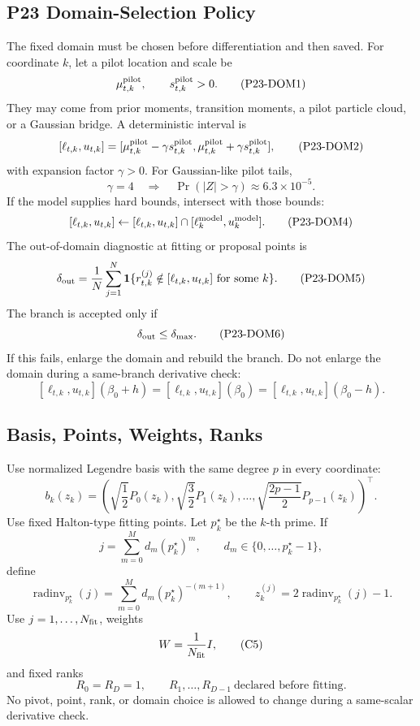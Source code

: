 \documentclass[11pt]{article}
\newcommand{\ind}{\mathbf 1}
\begin{document}
\subsection*{P23 Domain-Selection Policy}

The fixed domain must be chosen before differentiation and then saved.  For
coordinate \(k\), let a pilot location and scale be
\[
    \mu_{t,k}^{\rm pilot},
    \qquad
    s_{t,k}^{\rm pilot}>0.
    \tag{P23-DOM1}
\]
They may come from prior moments, transition moments, a pilot particle cloud,
or a Gaussian bridge.  A deterministic interval is
\[
    [\ell_{t,k},u_{t,k}]
    =
    [\mu_{t,k}^{\rm pilot}-\gamma s_{t,k}^{\rm pilot},
     \mu_{t,k}^{\rm pilot}+\gamma s_{t,k}^{\rm pilot}],
    \tag{P23-DOM2}
\]
with expansion factor \(\gamma>0\).  For Gaussian-like pilot tails,
\[
    \gamma=4
    \quad\Rightarrow\quad
    \Pr(|Z|>\gamma)\approx 6.3\times 10^{-5}.
    \tag{P23-DOM3}
\]
If the model supplies hard bounds, intersect with those bounds:
\[
    [\ell_{t,k},u_{t,k}]
    \leftarrow
    [\ell_{t,k},u_{t,k}]
    \cap
    [\ell_{k}^{\rm model},u_{k}^{\rm model}].
    \tag{P23-DOM4}
\]
The out-of-domain diagnostic at fitting or proposal points is
\[
    \delta_{\rm out}
    =
    \frac{1}{N}
    \sum_{j=1}^N
    \ind\{r_{t,k}^{(j)}\notin[\ell_{t,k},u_{t,k}]
    \text{ for some }k\}.
    \tag{P23-DOM5}
\]
The branch is accepted only if
\[
    \delta_{\rm out}\le \delta_{\max}.
    \tag{P23-DOM6}
\]
If this fails, enlarge the domain and rebuild the branch.  Do not enlarge the
domain during a same-branch derivative check:
\[
    [\ell_{t,k},u_{t,k}](\beta_0+h)
    =
    [\ell_{t,k},u_{t,k}](\beta_0)
    =
    [\ell_{t,k},u_{t,k}](\beta_0-h).
    \tag{P23-DOM7}
\]

\subsection{Basis, Points, Weights, Ranks}

Use normalized Legendre basis with the same degree \(p\) in every coordinate:
\[
    b_k(z_k)=
    \left(
    \sqrt{\frac12}P_0(z_k),
    \sqrt{\frac32}P_1(z_k),
    \ldots,
    \sqrt{\frac{2p-1}{2}}P_{p-1}(z_k)
    \right)^\top.
    \tag{C3}
\]
Use fixed Halton-type fitting points.  Let \(p_k^\star\) be the \(k\)-th prime.
If
\[
    j=\sum_{m=0}^{M}d_m(p_k^\star)^m,\qquad
    d_m\in\{0,\ldots,p_k^\star-1\},
\]
define
\[
    \operatorname{radinv}_{p_k^\star}(j)
    =
    \sum_{m=0}^{M}d_m(p_k^\star)^{-(m+1)},
    \qquad
    z_k^{(j)}=2\operatorname{radinv}_{p_k^\star}(j)-1.
    \tag{C4}
\]
Use \(j=1,\ldots,N_{\rm fit}\), weights
\[
    W=\frac1{N_{\rm fit}}I,
    \tag{C5}
\]
and fixed ranks
\[
    R_0=R_D=1,\qquad R_1,\ldots,R_{D-1}\ \text{declared before fitting}.
    \tag{C6}
\]
No pivot, point, rank, or domain choice is allowed to change during a
same-scalar derivative check.
\end{document}
